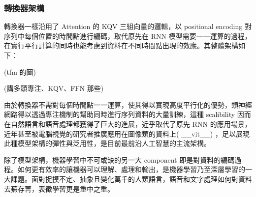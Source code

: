 \subsubsection{轉換器架構}

轉換器一樣沿用了 Attention 的 KQV 三組向量的邏輯，以 positional encoding 對序列中每個位置的時間點進行編碼，取代原先在 RNN 模型需要一一運算的過程，在實行平行計算的同時也能考慮到資料在不同時間點出現的效應。其整體架構如下：

(tfm 的圖)

(講多頭專注、KQV、FFN 那些)

由於轉換器不需對每個時間點一一運算，使其得以實現高度平行化的優勢，類神經網路得以透過專注機制的幫助同時進行序列資料的大量訓練，這種 scalibility 因而在自然語言和語音處理都獲得了巨大的進展，近乎取代了原先 RNN 的應用場景，近年甚至被電腦視覺的研究者推廣應用在圖像類的資料上( \_\_vit\_\_) ，足以展現此種模型架構的彈性與泛用性，是目前最前沿人工智慧的主流架構。

除了模型架構，機器學習中不可或缺的另一大 component 即是對資料的編碼過程。如何更有效率的讓機器可以理解、處理和輸出，是機器學習乃至深層學習的一大課題。面對捉摸不定、抽象且變化萬千的人類語言，語音和文字處理如何對資料去蕪存菁，表徵學習更是重中之重。

